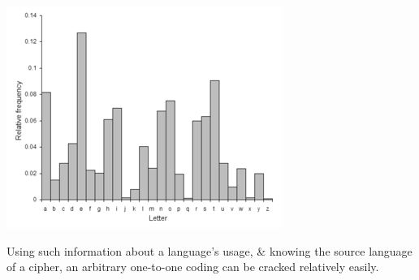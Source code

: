 \includegraphics{englishLetterFrequencies} \cite{englishLetterFreqGraph}

Using such information about a language's usage, \& knowing the source language of a cipher, an arbitrary one-to-one coding can be cracked relatively easily.

\nocite{*}


